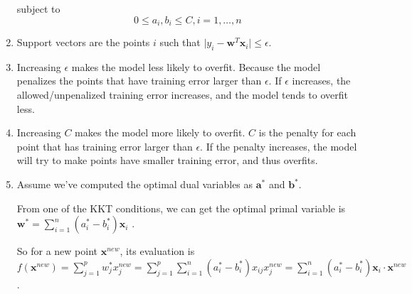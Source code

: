 \documentclass[paper=letter, fontsize=12pt]{article}
\begin{document}
\begin{enumerate}[label=(\alph*)]
	subject to 
	$$
	0 \leq a_i, b_i \leq C, i = 1, \dots, n
	$$
	
	\item
	Support vectors are the points $i$ such that $\vert y_i - \mathbf{w}^T \mathbf{x}_i \vert \leq \epsilon$.
	
	\item
	Increasing $\epsilon$ makes the model less likely to overfit. Because the model penalizes the points that have training error larger than $\epsilon$. If $\epsilon$ increases, the allowed/unpenalized training error increases, and the model tends to overfit less.
	
	\item
	Increasing $C$ makes the model more likely to overfit. $C$ is the penalty for each point that has training error larger than $\epsilon$. If the penalty increases, the model will try to make points have smaller training error, and thus overfits.
	
	\item    
	Assume we've computed the optimal dual variables as $\mathbf{a}^*$ and $\mathbf{b}^*$.
	
	From one of the KKT conditions, we can get the optimal primal variable is $\mathbf{w}^* = \sum_{i = 1}^{n} (a_i^* - b_i^*) \mathbf{x}_i$ .
	
	So for a new point $\mathbf{x}^{new}$, its evaluation is $f(\mathbf{x}^{new}) = \sum_{j = 1}^{p} w_j^* x_j^{new} = \sum_{j = 1}^{p} \sum_{i = 1}^{n} (a_i^* - b_i^*) x_{ij} x_j^{new} = \sum_{i = 1}^{n} (a_i^* - b_i^*) \mathbf{x}_i \cdot \mathbf{x}^{new }$.
\end{enumerate}
\end{document}
